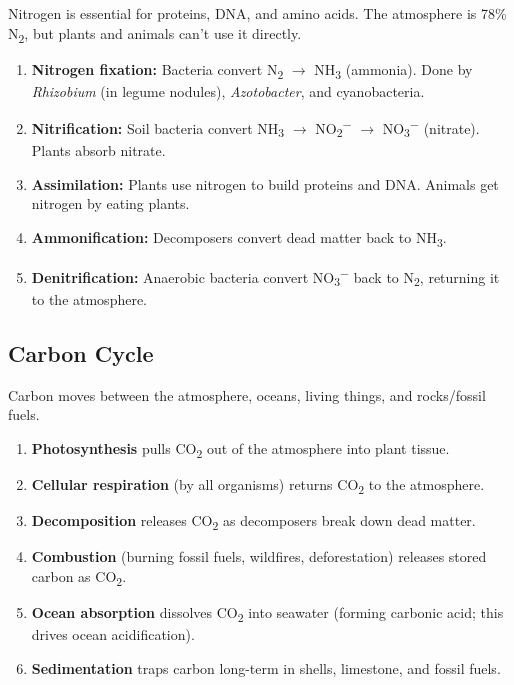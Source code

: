 \documentclass[11pt, letterpaper]{article}
\begin{document}
Nitrogen is essential for proteins, DNA, and amino acids. The atmosphere is 78\%
N\textsubscript{2}, but plants and animals can't use it directly.

\begin{enumerate}[noitemsep]
  \item \textbf{Nitrogen fixation:} Bacteria convert N\textsubscript{2} $\to$ NH\textsubscript{3} (ammonia). Done by \textit{Rhizobium} (in legume nodules), \textit{Azotobacter}, and cyanobacteria.
  \item \textbf{Nitrification:} Soil bacteria convert NH\textsubscript{3} $\to$ NO\textsubscript{2}\textsuperscript{$-$} $\to$ NO\textsubscript{3}\textsuperscript{$-$} (nitrate). Plants absorb nitrate.
  \item \textbf{Assimilation:} Plants use nitrogen to build proteins and DNA. Animals get nitrogen by eating plants.
  \item \textbf{Ammonification:} Decomposers convert dead matter back to NH\textsubscript{3}.
  \item \textbf{Denitrification:} Anaerobic bacteria convert NO\textsubscript{3}\textsuperscript{$-$} back to N\textsubscript{2}, returning it to the atmosphere.
\end{enumerate}

\subsection*{Carbon Cycle}

Carbon moves between the atmosphere, oceans, living things, and rocks/fossil fuels.

\begin{enumerate}[noitemsep]
  \item \textbf{Photosynthesis} pulls CO\textsubscript{2} out of the atmosphere into plant tissue.
  \item \textbf{Cellular respiration} (by all organisms) returns CO\textsubscript{2} to the atmosphere.
  \item \textbf{Decomposition} releases CO\textsubscript{2} as decomposers break down dead matter.
  \item \textbf{Combustion} (burning fossil fuels, wildfires, deforestation) releases stored carbon as CO\textsubscript{2}.
  \item \textbf{Ocean absorption} dissolves CO\textsubscript{2} into seawater (forming carbonic acid; this drives ocean acidification).
  \item \textbf{Sedimentation} traps carbon long-term in shells, limestone, and fossil fuels.
\end{enumerate}
\end{document}
